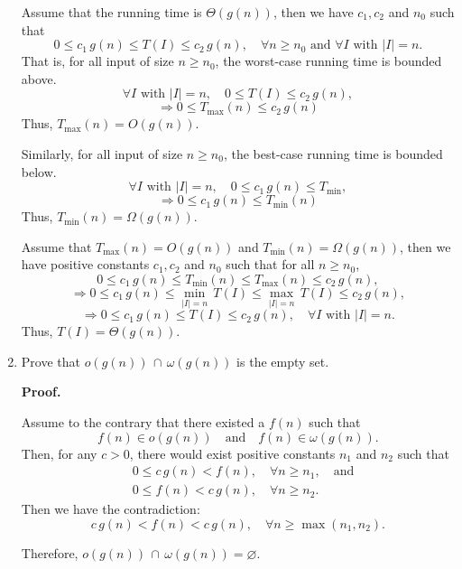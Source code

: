 \documentclass[12pt]{article}
\begin{document}
\begin{enumerate}
    \fbox{\(\Longrightarrow\)}

    Assume that the running time is \(\Theta(g(n))\), then we have \(c_1, c_2\) and \(n_0\) such that
    \[
        0 \leq c_1 \, g(n) \leq T(I) \leq c_2 \, g(n), \quad \forall n \geq n_0 \text{ and } \forall I \text{ with } |I| = n.
    \]
    That is, for all input of size \(n \geq n_0\), the worst-case running time is bounded above.
    \[
        \forall I \text{ with } |I| = n, \quad 0 \leq T(I) \leq c_2 \, g(n),
    \]
    \[
        \Rightarrow 0 \leq T_{\max}(n) \leq c_2 \, g(n)
    \]
    Thus, \(T_{\max}(n) = O(g(n))\).

    Similarly, for all input of size \(n \geq n_0\), the best-case running time is bounded below.
    \[
        \forall I \text{ with } |I| = n, \quad 0 \leq c_1 \, g(n) \leq T_{\min},
    \]
    \[
        \Rightarrow 0 \leq c_1 \, g(n) \leq T_{\min}(n) 
    \]
    Thus, \(T_{\min}(n) = \Omega(g(n))\).

    \fbox{\(\Longleftarrow\)}

    Assume that \(T_{\max}(n) = O(g(n))\) and \(T_{\min}(n) = \Omega(g(n))\), then we have positive constants \(c_1, c_2\) and \(n_0\) such that for all \(n \geq n_0\),
    \[
        0 \leq c_1 \, g(n) \leq T_{\min}(n) \leq T_{\max}(n) \leq c_2 \, g(n),
    \]
    \[
        \Rightarrow 0 \leq c_1 \, g(n) \leq \min_{|I| = n} \, T(I) \leq \max_{|I| = n} \, T(I) \leq c_2 \, g(n),
    \]
    \[
        \Rightarrow 0 \leq c_1 \, g(n) \leq T(I) \leq c_2 \, g(n), \quad \forall I \text{ with } |I| = n.
    \]
    Thus, \(T(I) = \Theta(g(n))\).

    \item Prove that \(o(g(n)) \, \cap \, \omega(g(n))\) is the empty set.

    \textbf{Proof.}

    Assume to the contrary that there existed a \(f(n)\) such that
    \[
        f(n) \in o(g(n)) \quad \text{and} \quad f(n) \in \omega(g(n)).
    \]
    Then, for any \(c > 0\), there would exist positive constants \(n_1\) and \(n_2\) such that
    \begin{align*}
        & 0 \leq c \, g(n) < f(n), \quad \forall n \geq n_1, \quad \text{and} \\
        & 0 \leq f(n) < c \, g(n), \quad \forall n \geq n_2.
    \end{align*}
    Then we have the contradiction:
    \[
        c \, g(n) < f(n) < c \, g(n), \quad \forall n \geq \max(n_1, n_2).
    \]

    Therefore, \(o(g(n)) \, \cap \, \omega(g(n)) = \varnothing\).


\end{enumerate}
\end{document}
